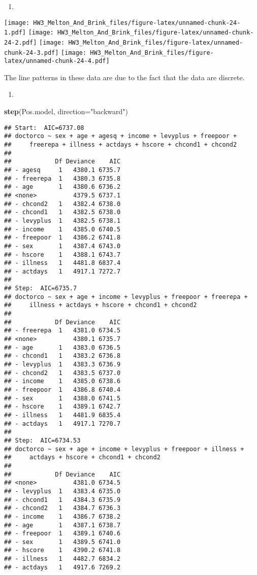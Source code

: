 \documentclass[
]{article}
\newenvironment{Shaded}{\begin{snugshade}}{\end{snugshade}}
\newcommand{\DataTypeTok}[1]{\textcolor[rgb]{0.13,0.29,0.53}{#1}}
\newcommand{\KeywordTok}[1]{\textcolor[rgb]{0.13,0.29,0.53}{\textbf{#1}}}
\newcommand{\NormalTok}[1]{#1}
\newcommand{\StringTok}[1]{\textcolor[rgb]{0.31,0.60,0.02}{#1}}
\begin{document}
\begin{enumerate}
\def\labelenumi{\alph{enumi})}
\setcounter{enumi}{1}
\item
\end{enumerate}

\texttt{[image: HW3\_Melton\_And\_Brink\_files/figure-latex/unnamed-chunk-24-1.pdf]}
\texttt{[image: HW3\_Melton\_And\_Brink\_files/figure-latex/unnamed-chunk-24-2.pdf]}
\texttt{[image: HW3\_Melton\_And\_Brink\_files/figure-latex/unnamed-chunk-24-3.pdf]}
\texttt{[image: HW3\_Melton\_And\_Brink\_files/figure-latex/unnamed-chunk-24-4.pdf]}

The line patterns in these data are due to the fact that the data are
discrete.

\begin{enumerate}
\def\labelenumi{\alph{enumi})}
\setcounter{enumi}{2}
\item
\end{enumerate}

\begin{Shaded}
\begin{Highlighting}[]
\KeywordTok{step}\NormalTok{(Pos.model, }\DataTypeTok{direction=}\StringTok{"backward"}\NormalTok{)}
\end{Highlighting}
\end{Shaded}

\begin{verbatim}
## Start:  AIC=6737.08
## doctorco ~ sex + age + agesq + income + levyplus + freepoor + 
##     freerepa + illness + actdays + hscore + chcond1 + chcond2
## 
##            Df Deviance    AIC
## - agesq     1   4380.1 6735.7
## - freerepa  1   4380.3 6735.8
## - age       1   4380.6 6736.2
## <none>          4379.5 6737.1
## - chcond2   1   4382.4 6738.0
## - chcond1   1   4382.5 6738.0
## - levyplus  1   4382.5 6738.1
## - income    1   4385.0 6740.5
## - freepoor  1   4386.2 6741.8
## - sex       1   4387.4 6743.0
## - hscore    1   4388.1 6743.7
## - illness   1   4481.8 6837.4
## - actdays   1   4917.1 7272.7
## 
## Step:  AIC=6735.7
## doctorco ~ sex + age + income + levyplus + freepoor + freerepa + 
##     illness + actdays + hscore + chcond1 + chcond2
## 
##            Df Deviance    AIC
## - freerepa  1   4381.0 6734.5
## <none>          4380.1 6735.7
## - age       1   4383.0 6736.5
## - chcond1   1   4383.2 6736.8
## - levyplus  1   4383.3 6736.9
## - chcond2   1   4383.5 6737.0
## - income    1   4385.0 6738.6
## - freepoor  1   4386.8 6740.4
## - sex       1   4388.0 6741.5
## - hscore    1   4389.1 6742.7
## - illness   1   4481.9 6835.4
## - actdays   1   4917.1 7270.7
## 
## Step:  AIC=6734.53
## doctorco ~ sex + age + income + levyplus + freepoor + illness + 
##     actdays + hscore + chcond1 + chcond2
## 
##            Df Deviance    AIC
## <none>          4381.0 6734.5
## - levyplus  1   4383.4 6735.0
## - chcond1   1   4384.3 6735.9
## - chcond2   1   4384.7 6736.3
## - income    1   4386.7 6738.2
## - age       1   4387.1 6738.7
## - freepoor  1   4389.1 6740.6
## - sex       1   4389.5 6741.0
## - hscore    1   4390.2 6741.8
## - illness   1   4482.7 6834.2
## - actdays   1   4917.6 7269.2
\end{verbatim}
\end{document}
